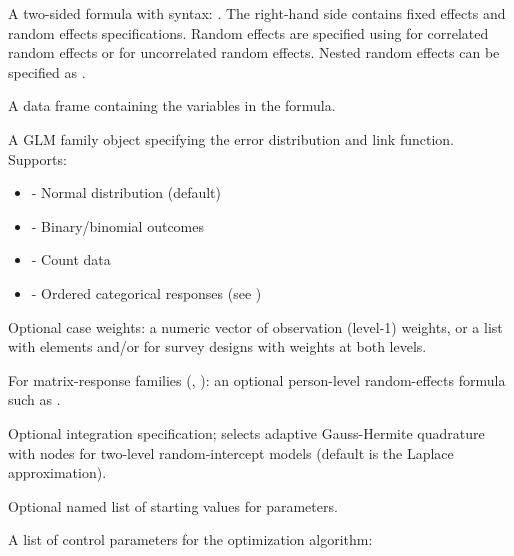 \documentclass[a4paper]{book}
\begin{document}
\begin{Arguments}
\begin{ldescription}
\item[\code{formula}] A two-sided formula with syntax: .
The right-hand side contains fixed effects and random effects specifications.
Random effects are specified using  for correlated
random effects or  for uncorrelated random effects.
Nested random effects can be specified as .

\item[\code{data}] A data frame containing the variables in the formula.

\item[\code{family}] A GLM family object specifying the error distribution and link
function. Supports:
\begin{itemize}

\item{}  - Normal distribution (default)
\item{}  - Binary/binomial outcomes
\item{}  - Count data
\item{}  - Ordered categorical responses (see )

\end{itemize}


\item[\code{weights}] Optional case weights: a numeric vector of observation
(level-1) weights, or a list with elements  and/or
 for survey designs with weights at both levels.

\item[\code{random}] For matrix-response families (, ):
an optional person-level random-effects formula such as
.

\item[\code{integration}] Optional integration specification; 
selects adaptive Gauss-Hermite quadrature with  nodes for
two-level random-intercept models (default is the Laplace
approximation).

\item[\code{start}] Optional named list of starting values for parameters.

\item[\code{control}] A list of control parameters for the optimization algorithm:
\begin{description}


\end{description}
\end{ldescription}
\end{Arguments}
\end{document}
